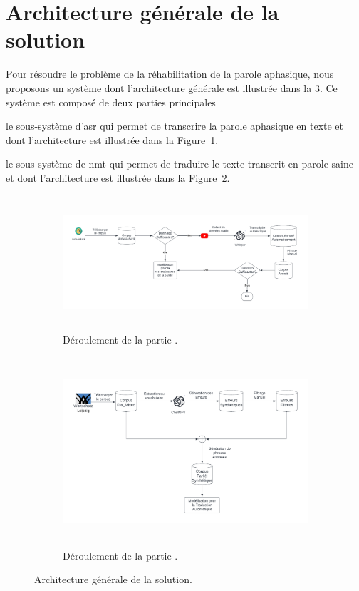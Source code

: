 \section{Architecture générale de la solution}

Pour résoudre le problème de la réhabilitation de la parole aphasique,
nous proposons un système dont l'architecture générale est illustrée dans la \cref{fig.archi}.
Ce système est composé de deux parties principales 
\begin{enumerate*}[label=(\alph*)]
    \item le sous-système d'\gls{asr} qui permet de transcrire la parole aphasique en texte
    et dont l'architecture est illustrée dans la Figure~\ref{fig.asr-archi}.
    \item le sous-système de \gls{nmt} qui permet de traduire le texte transcrit en parole saine
    et dont l'architecture est illustrée dans la Figure~\ref{fig.nmt-archi}.
\end{enumerate*}

\begin{figure}[hbt]
    \begin{subfigure}{\textwidth}
        \begin{center}
            \includegraphics[height=5cm]{assets/pdf/ASR.pdf}
        \end{center}
        \caption{Déroulement de la partie .}
        \label{fig.asr-archi}
    \end{subfigure}
    \begin{subfigure}{\textwidth}
        \begin{center}
            \includegraphics[height=7cm]{assets/pdf/NMT.pdf}
        \end{center}
        \caption{Déroulement de la partie .}
        \label{fig.nmt-archi}
    \end{subfigure}
    \caption{Architecture générale de la solution.}
    \label{fig.archi} 
\end{figure}

